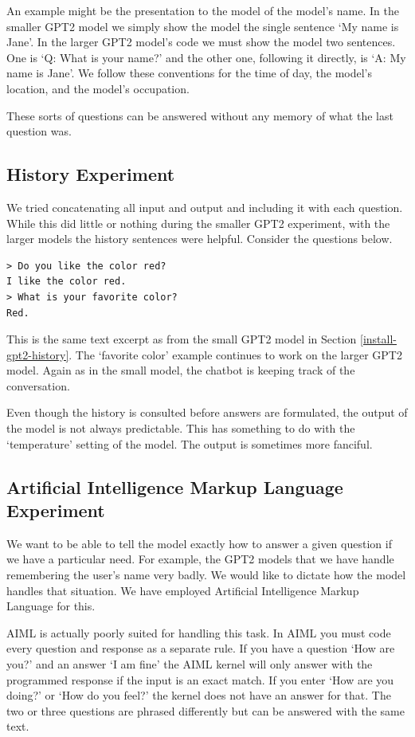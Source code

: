 An example might be the presentation to the model of the model's name. In the smaller GPT2 model we simply show the model the single sentence `My name is Jane'. In the larger GPT2 model's code we must show the model two sentences. One is `Q: What is your name?' and the other one, following it directly, is `A: My name is Jane'. We follow these conventions for the time of day, the model's location, and the model's occupation.

These sorts of questions can be answered without any memory of what the last question was.

\subsection{History Experiment}

We tried concatenating all input and output and including it with each question. While this did little or nothing during the smaller GPT2 experiment, with the larger models the history sentences were helpful. Consider the questions below.
\begin{verbatim}
> Do you like the color red?
I like the color red.
> What is your favorite color?
Red.
\end{verbatim}
This is the same text excerpt as from the small GPT2 model in Section \ref{install-gpt2-history}. The `favorite color' example continues to work on the larger GPT2 model. Again as in the small model, the chatbot is keeping track of the conversation. 

Even though the history is consulted before answers are formulated, the output of the model is not always predictable. This has something to do with the `temperature' setting of the model. The output is sometimes more fanciful.


\subsection{Artificial Intelligence Markup Language Experiment}

We want to be able to tell the model exactly how to answer a given question if we have a particular need. For example, the GPT2 models that we have handle remembering the user's name very badly. We would like to dictate how the model handles that situation. We have employed Artificial Intelligence Markup Language for this. 

AIML is actually poorly suited for handling this task. In AIML you must code every question and response as a separate rule. If you have a question `How are you?' and an answer `I am fine' the AIML kernel will only answer with the programmed response if the input is an exact match. If you enter `How are you doing?' or `How do you feel?' the kernel does not have an answer for that. The two or three questions are phrased differently but can be answered with the same text.


